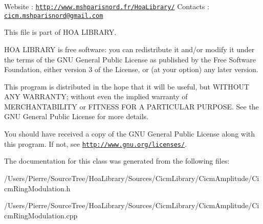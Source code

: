Website \-: \href{http://www.mshparisnord.fr/HoaLibrary/}{\tt http\-://www.\-mshparisnord.\-fr/\-Hoa\-Library/} Contacts \-: \href{mailto:cicm.mshparisnord@gmail.com}{\tt cicm.\-mshparisnord@gmail.\-com}

This file is part of H\-O\-A L\-I\-B\-R\-A\-R\-Y.

H\-O\-A L\-I\-B\-R\-A\-R\-Y is free software\-: you can redistribute it and/or modify it under the terms of the G\-N\-U General Public License as published by the Free Software Foundation, either version 3 of the License, or (at your option) any later version.

This program is distributed in the hope that it will be useful, but W\-I\-T\-H\-O\-U\-T A\-N\-Y W\-A\-R\-R\-A\-N\-T\-Y; without even the implied warranty of M\-E\-R\-C\-H\-A\-N\-T\-A\-B\-I\-L\-I\-T\-Y or F\-I\-T\-N\-E\-S\-S F\-O\-R A P\-A\-R\-T\-I\-C\-U\-L\-A\-R P\-U\-R\-P\-O\-S\-E. See the G\-N\-U General Public License for more details.

You should have received a copy of the G\-N\-U General Public License along with this program. If not, see \href{http://www.gnu.org/licenses/}{\tt http\-://www.\-gnu.\-org/licenses/}. 

The documentation for this class was generated from the following files\-:\begin{DoxyCompactItemize}
\item 
/\-Users/\-Pierre/\-Source\-Tree/\-Hoa\-Library/\-Sources/\-Cicm\-Library/\-Cicm\-Amplitude/Cicm\-Ring\-Modulation.\-h\item 
/\-Users/\-Pierre/\-Source\-Tree/\-Hoa\-Library/\-Sources/\-Cicm\-Library/\-Cicm\-Amplitude/Cicm\-Ring\-Modulation.\-cpp\end{DoxyCompactItemize}
